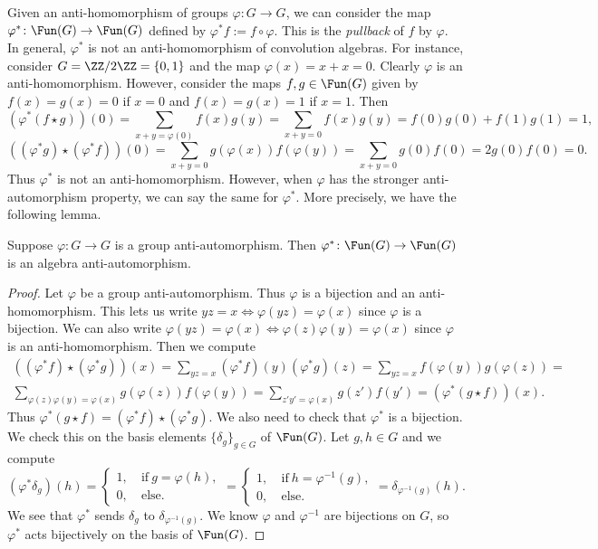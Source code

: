 Given an anti-homomorphism of groups $\varphi\colon G\to G$, we can consider the map $\varphi^\ast\colon\Fun(G)\to\Fun(G)$ defined by $\varphi^\ast f := f\circ \varphi$.
This is the \emph{pullback} of $f$ by $\varphi$.
In general, $\varphi^\ast$ is not an anti-homomorphism of convolution algebras.
For instance, consider $G=\ZZ/2\ZZ=\{0,1\}$ and the map $\varphi(x)=x+x=0$.
Clearly $\varphi$ is an anti-homomorphism.
However, consider the maps $f,g\in\Fun(G)$ given by $f(x)=g(x)=0$ if $x=0$ and $f(x)=g(x)=1$ if $x=1$.
Then
\[
    (\varphi^\ast(f\star g))(0) = \sum_{x+y = \varphi(0)} f(x)g(y) = \sum_{x+y = 0} f(x)g(y) = f(0)g(0) + f(1)g(1) = 1,
\]
\[
    ((\varphi^\ast g)\star(\varphi^\ast f))(0) = \sum_{x+y = 0} g(\varphi(x))f(\varphi(y)) = \sum_{x+y = 0} g(0)f(0) = 2g(0)f(0) = 0.
\]
Thus $\varphi^\ast$ is not an anti-homomorphism.
However, when $\varphi$ has the stronger anti-automorphism property, we can say the same for $\varphi^\ast$.
More precisely, we have the following lemma.
\begin{lem}
    Suppose $\varphi\colon G\to G$ is a group anti-automorphism.
    Then $\varphi^\ast\colon\Fun(G)\to\Fun(G)$ is an algebra anti-automorphism.
\end{lem}
\begin{proof}
    Let $\varphi$ be a group anti-automorphism.
    Thus $\varphi$ is a bijection and an anti-homomorphism.
    This lets us write $yz=x \iff \varphi(yz)=\varphi(x)$ since $\varphi$ is a bijection.
    We can also write $\varphi(yz)=\varphi(x) \iff \varphi(z)\varphi(y)=\varphi(x)$ since $\varphi$ is an anti-homomorphism.
    Then we compute
    \begin{multline*}
        ((\varphi^\ast f)\star(\varphi^\ast g))(x) = \sum_{yz=x} (\varphi^\ast f)(y)(\varphi^\ast g)(z) = \sum_{yz=x} f(\varphi(y)) g(\varphi(z)) = \\
        \sum_{\varphi(z)\varphi(y)=\varphi(x)} g(\varphi(z))f(\varphi(y)) = \sum_{z'y'=\varphi(x)} g(z')f(y') = (\varphi^\ast(g\star f))(x).
    \end{multline*}
    Thus $\varphi^\ast(g\star f) = (\varphi^\ast f)\star(\varphi^\ast g)$.
    We also need to check that $\varphi^\ast$ is a bijection.
    We check this on the basis elements $\{\delta_g\}_{g\in G}$ of $\Fun(G)$.
    Let $g,h\in G$ and we compute
    \[
        (\varphi^\ast\delta_g)(h) = \begin{cases}
            1,\  & \text{if}\ g=\varphi(h), \\
            0,\  & \text{else}.
        \end{cases} = \begin{cases}
            1,\  & \text{if}\ h=\varphi^{-1}(g), \\
            0,\  & \text{else}.
        \end{cases} = \delta_{\varphi^{-1}(g)}(h).
    \]
    We see that $\varphi^\ast$ sends $\delta_g$ to $\delta_{\varphi^{-1}(g)}$.
    We know $\varphi$ and $\varphi^{-1}$ are bijections on $G$, so $\varphi^\ast$ acts bijectively on the basis of $\Fun(G)$.
\end{proof}
